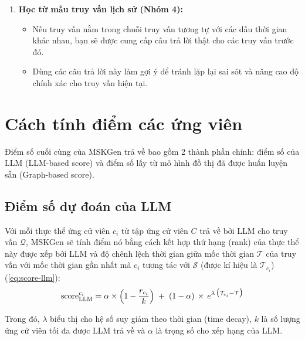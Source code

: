 \begin{enumerate}
\begin{itemize}
        \item Dùng phương pháp này để dự đoán có cơ sở khi thiếu bằng chứng trực tiếp.
    \end{itemize}
    \item \textbf{Học từ mẫu truy vấn lịch sử (Nhóm 4):}
    \begin{itemize}
        \item Nếu truy vấn nằm trong chuỗi truy vấn tương tự với các dấu thời gian khác nhau, bạn sẽ được cung cấp câu trả lời thật cho các truy vấn trước đó.
        \item Dùng các câu trả lời này làm gợi ý để tránh lặp lại sai sót và nâng cao độ chính xác cho truy vấn hiện tại.
    \end{itemize}
\end{enumerate}


\vspace{1em}
\section{Cách tính điểm các ứng viên}

Điểm số cuối cùng của MSKGen trả về bao gồm 2 thành phần chính: điểm số của LLM (LLM-based score) và điểm số lấy từ mô hình đồ thị đã được huấn luyện sẵn (Graph-based score).

\vspace{1em}
\subsection{Điểm số dự đoán của LLM}

Với mỗi thực thể ứng cử viên $c_i$ từ tập ứng cử viên $C$ trả về bởi LLM cho truy vấn $\mathcal{Q}$, MSKGen sẽ tính điểm nó bằng cách kết hợp thứ hạng (rank) của thực thể này được xếp bởi LLM và độ chênh lệch thời gian giữa mốc thời gian $\mathcal{T}$ của truy vấn với mốc thời gian gần nhất mà $c_i$ tương tác với $\mathcal{S}$ (được kí hiệu là $\mathcal{T}_{c_i}$) (\ref{eq:score-llm}):
\begin{equation}  
\label{eq:score-llm}  
\text{score}^{c_i}_{\text{LLM}}   
= \alpha \times \Bigl(1 - \frac{r_{c_i}}{k}\Bigr)  
\;+\; (1 - \alpha)\,\times\, e^{\lambda \,\bigl(\mathcal{T}_{c_i} - \mathcal{T}\bigr)}   
\end{equation}

Trong đó, $\lambda$ biểu thị cho hệ số suy giảm theo thời gian (time decay), $k$ là số lượng ứng cử viên tối đa được LLM trả về và $\alpha$ là trọng số cho xếp hạng của LLM. 

